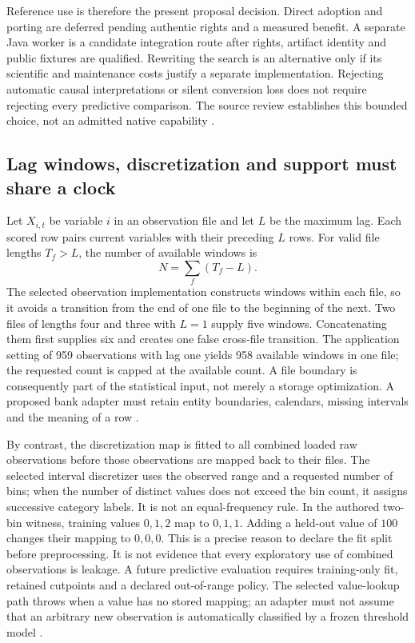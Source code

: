 Reference use is therefore the present proposal decision. Direct adoption and
porting are deferred pending authentic rights and a measured benefit.
A separate Java worker is a candidate integration route after rights, artifact
identity and public fixtures are qualified. Rewriting the search is an
alternative only if its scientific and maintenance costs justify a separate
implementation. Rejecting automatic causal interpretations or silent
conversion loss does not require rejecting every predictive comparison.
The source review establishes this bounded choice, not an admitted native
capability \citep{exec24_banjo_choice}.

\subsection{Lag windows, discretization and support must share a clock}
Let $X_{i,t}$ be variable $i$ in an observation file and let $L$ be the maximum
lag. Each scored row pairs current variables with their preceding $L$ rows.
For valid file lengths $T_f>L$, the number of available windows is
\[
 N=\sum_f(T_f-L).
\]
The selected observation implementation constructs windows within each file,
so it avoids a transition from the end of one file to the beginning of the
next. Two files of lengths four and three with $L=1$ supply five windows.
Concatenating them first supplies six and creates one false cross-file
transition. The application setting of 959 observations with lag one yields
958 available windows in one file; the requested count is capped at the
available count. A file boundary is consequently part of the statistical
input, not merely a storage optimization. A proposed bank adapter must retain
entity boundaries, calendars, missing intervals and the meaning of a row
\citep{exec24_banjo_source,exec24_banjo_choice}.

By contrast, the discretization map is fitted to all combined loaded raw
observations before those observations are mapped back to their files.
The selected interval discretizer uses the observed range and a requested
number of bins; when the number of distinct values does not exceed the bin
count, it assigns successive category labels. It is not an equal-frequency
rule. In the authored two-bin witness, training values $0,1,2$ map to
$0,1,1$. Adding a held-out value of $100$ changes their mapping to $0,0,0$.
This is a precise reason to declare the fit split before preprocessing.
It is not evidence that every exploratory use of combined observations is
leakage. A future predictive evaluation requires training-only fit, retained
cutpoints and a declared out-of-range policy. The selected value-lookup path
throws when a value has no stored mapping; an adapter must not assume that
an arbitrary new observation is automatically classified by a frozen
threshold model \citep{exec24_banjo_source,exec24_banjo_choice}.

